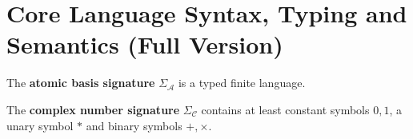 \documentclass[manuscript, review, timestamp]{acmart}
\begin{document}





\clearpage
\appendix


\section{Core Language Syntax, Typing and Semantics (Full Version)}

\begin{definition} 
  The \textbf{atomic basis signature} $\Sigma_\mathcal{A}$ is a  typed finite language.
\end{definition}

\begin{definition} 
  The \textbf{complex number signature} $\Sigma_\mathcal{C}$ contains at least constant symbols $0, 1$, a unary symbol $*$ and binary symbols $+, \times$.
\end{definition}
\end{document}
